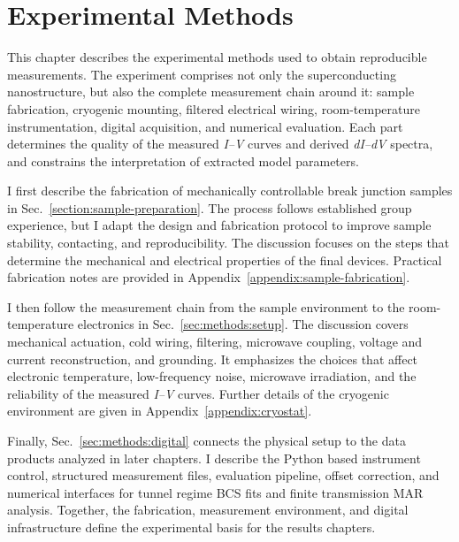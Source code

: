 
\chapter{Experimental Methods}
\label{ch:methods}
\thispagestyle{chapterstart}

    This chapter describes the experimental methods used to obtain reproducible measurements. The experiment comprises not only the superconducting nanostructure, but also the complete measurement chain around it: sample fabrication, cryogenic mounting, filtered electrical wiring, room-temperature instrumentation, digital acquisition, and numerical evaluation. Each part determines the quality of the measured \textit{I--V} curves and derived \textit{dI--dV} spectra, and constrains the interpretation of extracted model parameters.

    I first describe the fabrication of mechanically controllable break junction samples in Sec.~\ref{section:sample-preparation}. The process follows established group experience, but I adapt the design and fabrication protocol to improve sample stability, contacting, and reproducibility. The discussion focuses on the steps that determine the mechanical and electrical properties of the final devices. Practical fabrication notes are provided in Appendix~\ref{appendix:sample-fabrication}.

    I then follow the measurement chain from the sample environment to the room-temperature electronics in Sec.~\ref{sec:methods:setup}. The discussion covers mechanical actuation, cold wiring, filtering, microwave coupling, voltage and current reconstruction, and grounding. It emphasizes the choices that affect electronic temperature, low-frequency noise, microwave irradiation, and the reliability of the measured \textit{I--V} curves. Further details of the cryogenic environment are given in Appendix~\ref{appendix:cryostat}.

    Finally, Sec.~\ref{sec:methods:digital} connects the physical setup to the data products analyzed in later chapters. I describe the Python based instrument control, structured measurement files, evaluation pipeline, offset correction, and numerical interfaces for tunnel regime BCS fits and finite transmission MAR analysis. Together, the fabrication, measurement environment, and digital infrastructure define the experimental basis for the results chapters.
